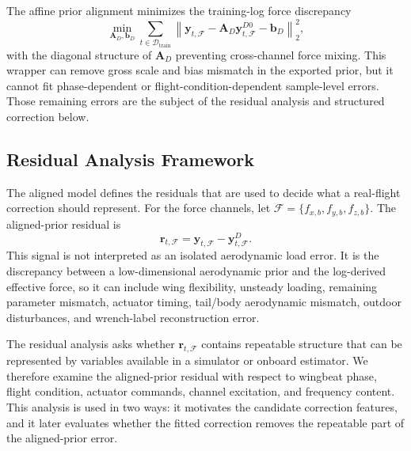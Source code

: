 The affine prior alignment minimizes the training-log force discrepancy
\begin{equation}
  \min_{\mathbf{A}_{D},\mathbf{b}_{D}}
  \sum_{t\in\mathcal{D}_{\mathrm{train}}}
  \left\|
    \mathbf{y}_{t,\mathcal{F}}
    -
    \mathbf{A}_{D}\mathbf{y}^{D0}_{t,\mathcal{F}}
    -
    \mathbf{b}_{D}
  \right\|_2^2 ,
  \label{eq:prior_calibration_objective}
\end{equation}
with the diagonal structure of $\mathbf{A}_{D}$ preventing cross-channel force mixing. This wrapper can remove gross scale and bias mismatch in the exported prior, but it cannot fit phase-dependent or flight-condition-dependent sample-level errors. Those remaining errors are the subject of the residual analysis and structured correction below.

\subsection{Residual Analysis Framework}
\label{subsec:residual_structure_methods}

The aligned model defines the residuals that are used to decide what a real-flight correction should represent. For the force channels, let $\mathcal{F}=\{f_{x,b},f_{y,b},f_{z,b}\}$. The aligned-prior residual is
\begin{equation}
  \mathbf{r}_{t,\mathcal{F}}
  =
  \mathbf{y}_{t,\mathcal{F}}
  -
  \mathbf{y}^{D}_{t,\mathcal{F}} .
  \label{eq:force_residual_target}
\end{equation}
This signal is not interpreted as an isolated aerodynamic load error. It is the discrepancy between a low-dimensional aerodynamic prior and the log-derived effective force, so it can include wing flexibility, unsteady loading, remaining parameter mismatch, actuator timing, tail/body aerodynamic mismatch, outdoor disturbances, and wrench-label reconstruction error.

The residual analysis asks whether $\mathbf{r}_{t,\mathcal{F}}$ contains repeatable structure that can be represented by variables available in a simulator or onboard estimator. We therefore examine the aligned-prior residual with respect to wingbeat phase, flight condition, actuator commands, channel excitation, and frequency content. This analysis is used in two ways: it motivates the candidate correction features, and it later evaluates whether the fitted correction removes the repeatable part of the aligned-prior error.

